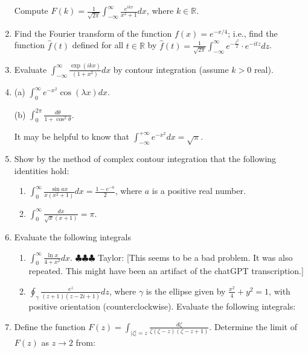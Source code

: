 \documentclass[a4paper,10pt]{article}
\newcommand{\taylor}[1]{{\color{blue} \sf $\clubsuit\clubsuit\clubsuit$ Taylor: [#1]}}
\begin{document}
\begin{enumerate}
	Compute $F(k) = \frac{1}{\sqrt{2\pi}}\int_{-\infty}^{\infty}\frac{e^{ikx}}{x^{2}+1}dx$, where $k \in \mathbb{R}$.
	
	\item 
	
	Find the Fourier transform of the function $f(x) = e^{-x/4}$; i.e., find the function $\hat{f}(t)$ defined for all $t \in \mathbb{R}$ by $\hat{f}(t) = \frac{1}{\sqrt{2\pi}}\int_{-\infty}^{\infty}e^{-\frac{z^{2}}{2}} \cdot e^{-itz}dz$.
	
	\item 
	
	Evaluate $\int_{-\infty}^{\infty}\frac{\exp(ikx)}{(1+x^{2})}dx$ by contour integration (assume $k > 0$ real).
	
	\item 
	(a) $\int_{0}^{\infty}e^{-x^{2}}\cos(\lambda x)dx$.
	
	(b) $\int_{0}^{2\pi}\frac{d\theta}{1+\cos^{2}\theta}$.
	
	It may be helpful to know that $\int_{-\infty}^{+\infty}e^{-x^{2}}dx = \sqrt{\pi}$.
	
	\item 
	
	Show by the method of complex contour integration that the following identities hold:
	\begin{enumerate}
		\item $\int_{0}^{\infty}\frac{\sin ax}{x(x^{2}+1)}dx = \frac{1-e^{-a}}{2}$, where $a$ is a positive real number.
		
		\item $\int_{0}^{\infty}\frac{dx}{\sqrt{x}(x+1)} = \pi$.
	\end{enumerate}
	
\item Evaluate the following integrals
\begin{enumerate}
	 \item  $\int_{0}^{\infty}\frac{\ln x}{4+x^{2}}dx$. \taylor{This seems to be a bad problem. It was also repeated. This might have been an artifact of the chatGPT transcription.}
	\item  $\oint_{\gamma}\frac{e^{z}}{(z+1)(z-2i+1)}dz$, where $\gamma$ is the ellipse given by $\frac{x^{2}}{4} + y^{2} = 1$, with positive orientation (counterclockwise).
	Evaluate the following integrals:
\end{enumerate}
		
\item 
	Define the function $F(z) = \int_{|\zeta| = z}\frac{d\zeta}{\zeta(\zeta-z)(\zeta-z+1)}$. Determine the limit of $F(z)$ as $z \rightarrow 2$ from:
	

\end{enumerate}
\end{document}
